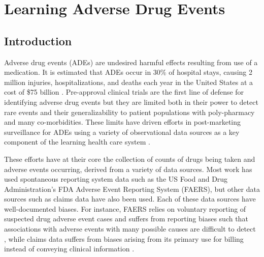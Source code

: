 \chapter{Learning Adverse Drug Events}
\section{Introduction}
Adverse drug events (ADEs) are undesired harmful effects resulting
from use of a medication. It is estimated that ADEs occur in 30\% of
hospital stays, causing 2 million injuries, hospitalizations, and
deaths each year in the United States at a cost of \$75 billion
\cite{Classen1997,Classen2011,Lazarou1998}. Pre-approval clinical
trials are the first line of defense for identifying adverse drug
events but they are limited both in their power to detect rare events
and their generalizability to patient populations with poly-pharmacy
and many co-morbidities. These limits have driven efforts in
post-marketing surveillance for ADEs using a variety of observational
data sources as a key component of the learning health care system
\cite{Tatonetti2009,Lependu2013,Harpaz2014,Friedman2009}.

These efforts have at their core the collection of counts of drugs
being taken and adverse events occurring, derived from a variety of
data sources. Most work has used spontaneous reporting system data
such as the US Food and Drug Administration’s FDA Adverse Event
Reporting System (FAERS), but other data sources such as claims data
have also been used. Each of these data sources have well-documented
biases. For instance, FAERS relies on voluntary reporting of suspected
drug adverse event cases and suffers from reporting biases such that
associations with adverse events with many possible causes are
difficult to detect \cite{Harpaz2013}, while claims data suffers from
biases arising from its primary use for billing instead of conveying
clinical information \cite{Ryan2013}.

